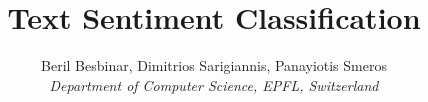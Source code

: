 \documentclass[10pt,conference,compsocconf]{IEEEtran}
\begin{document}
\title{Text Sentiment Classification}

\author{Beril Besbinar, Dimitrios Sarigiannis, Panayiotis Smeros\\
\textit{Department of Computer Science, EPFL, Switzerland}}

\maketitle
















\cleardoublepage


\end{document}
